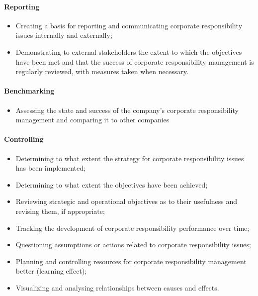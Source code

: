 \documentclass[11pt]{article}
\theoremstyle{definition}
\begin{document}
\paragraph{Reporting}
\begin{itemize}
	\item Creating a basis for reporting and communicating corporate responsibility issues internally and externally;
	\item Demonstrating to external stakeholders the extent to which the objectives have been met and that the success of corporate responsibility management is regularly reviewed, with measures taken when necessary.
\end{itemize}

\paragraph{Benchmarking}
\begin{itemize}
	\item Assessing the state and success of the company's corporate responsibility management and comparing it to other companies
\end{itemize}

\paragraph{Controlling}
\begin{itemize}
	\item Determining to what extent the strategy for corporate responsibility issues has been implemented;
	\item Determining to what extent the objectives have been achieved;
	\item Reviewing strategic and operational objectives as to their usefulness and revising them, if appropriate;
	\item Tracking the development of corporate responsibility performance over time;
	\item Questioning assumptions or actions related to corporate responsibility issues;
	\item Planning and controlling resources for corporate responsibility management better (learning effect);
	\item Visualizing and analysing relationships between causes and effects.
\end{itemize}
\end{document}
